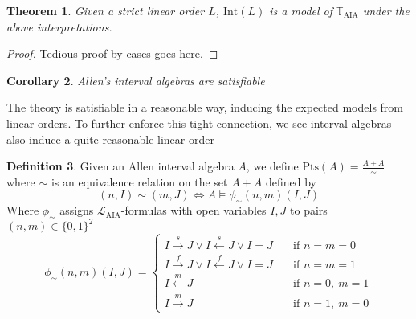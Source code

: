 \documentclass[11pt %
              ]{article}
\newcommand{\lang}{\mathcal{L}}
\newcommand{\theory}{\mathbb{T}}
\newcommand{\laia}{\lang_\text{AIA}}
\newcommand{\taia}{\theory_\text{AIA}}
\newcommand{\meets}{\overset{m}{\longrightarrow}}
\newcommand{\starts}{\overset{s}{\longrightarrow}}
\newcommand{\finishes}{\overset{f}{\longrightarrow}}
\newcommand{\metby}{\overset{m}{\longleftarrow}}
\newcommand{\startedby}{\overset{s}{\longleftarrow}}
\newcommand{\finishedby}{\overset{f}{\longleftarrow}}
\newcommand{\inter}[1][-]{\text{Int}\left(#1\right)}
\newcommand{\psim}{\sim}
\newcommand{\peq}{\phi_\sim}
\newcommand{\points}[1][-]{\text{Pts}\left(#1\right)}
\theoremstyle{plain}
\newtheorem{thm}{Theorem}%
\newtheorem{cor}[thm]{Corollary}
\theoremstyle{definition}
\newtheorem{defn}[thm]{Definition}
\theoremstyle{remark}
\begin{document}
\begin{thm}
  Given a strict linear order $L$, $\inter[L]$ is a model of $\taia$ under the above
  interpretations.
\end{thm}
\begin{proof}
  Tedious proof by cases goes here.
\end{proof}

\begin{cor}
  Allen's interval algebras are satisfiable
\end{cor}

The theory is satisfiable in a reasonable way, inducing the expected models from linear orders.
To further enforce this tight connection, we see interval algebras also induce a quite reasonable
linear order

\begin{defn}
  Given an Allen interval algebra $A$, we define $\points[A] = \frac{A + A}{\psim}$ where
  $\psim$ is an equivalence relation on the set $A + A$ defined by
  \begin{equation*}
    (n,I) \psim (m,J) \iff A \models \peq(n,m)(I,J)
  \end{equation*}
  Where $\peq$ assigns $\laia$-formulas with open variables $I,J$ to pairs $(n,m) \in \{0,1\}^2$
  \begin{equation*}
    \peq(n,m)(I,J) = \begin{cases}
      I \starts J \lor I \startedby J \lor I = J \quad & \text{if } n = m = 0\\
      I \finishes J \lor I \finishedby J \lor I = J    & \text{if } n = m = 1 \\
      I \metby J                                       & \text{if } n = 0,\ m = 1 \\
      I \meets J                                       & \text{if } n = 1,\ m = 0
    \end{cases}
  \end{equation*}
\end{defn}
\end{document}
